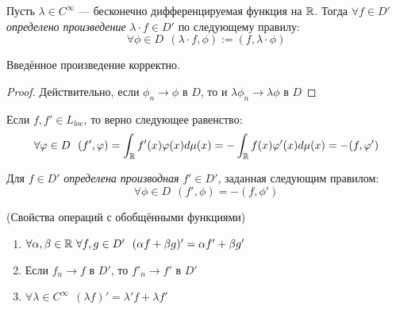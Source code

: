 \begin{definition}
	Пусть $\lambda \in C^{\infty}$ --- бесконечно дифференцируемая функция на $\mathbb{R}$. Тогда $\forall f \in D'$ \textit{определено произведение} $\lambda \cdot f \in D'$ по следующему правилу:
	\[
		\forall \phi \in D\ \ (\lambda \cdot f, \phi) := (f, \lambda \cdot \phi)
	\]
\end{definition}

\begin{proposition}
	Введённое произведение корректно.
\end{proposition}

\begin{proof}
	Действительно, если $\phi_n \to \phi$ в $D$, то и $\lambda\phi_n \to \lambda\phi$ в $D$
\end{proof}

\begin{note}
	Если $f, f' \in L_{loc}$, то верно следующее равенство:
	\[
		\forall \varphi \in D\ \ (f', \varphi) = \int_{\mathbb{R}} f'(x)\varphi(x)d\mu(x) = -\int_{\mathbb{R}} f(x)\varphi'(x)d\mu(x) = -(f, \varphi')
	\]
\end{note}

\begin{definition}
	Для $f \in D'$ \textit{определена производная} $f' \in D'$, заданная следующим правилом:
	\[
		\forall \phi \in D\ \ (f', \phi) = -(f, \phi')
	\]
\end{definition}

\begin{theorem} (Свойства операций с обобщёнными функциями)
	\begin{enumerate}
		\item $\forall \alpha, \beta \in \mathbb{R}\ \forall f, g \in D'\ \ (\alpha f + \beta g)' = \alpha f' + \beta g'$
		
		\item Если $f_n \to f$ в $D'$, то $f'_n \to f'$ в $D'$
		
		\item $\forall \lambda \in C^{\infty}\ \ (\lambda f)' = \lambda' f + \lambda f'$
	\end{enumerate}
\end{theorem}

